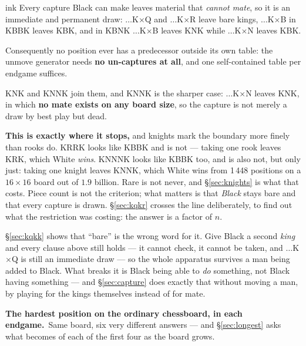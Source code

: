\documentclass[11pt]{article}
\begin{document}
\begin{result}[title={The invariant that makes them tractable}]{ink}
Every capture Black can make leaves material that \emph{cannot mate}, so it is
an immediate and permanent draw:
\;$\ldots$K$\times$Q and $\ldots$K$\times$R leave bare kings,
$\ldots$K$\times$B in KBBK leaves KBK,
and in KBNK $\ldots$K$\times$B leaves KNK while $\ldots$K$\times$N leaves KBK.

Consequently no position ever has a predecessor outside its own table: the
unmove generator needs \textbf{no un-captures at all}, and one self-contained
table per endgame suffices.

KNK and KNNK join them, and KNNK is the sharper case: $\ldots$K$\times$N leaves
KNK, in which \textbf{no mate exists on any board size}, so the capture is not
merely a draw by best play but dead.

\medskip
\textbf{This is exactly where it stops,} and knights mark the boundary more
finely than rooks do. KRRK looks like KBBK and is not --- taking one rook leaves
KRK, which White \emph{wins}. KNNNK looks like KBBK too, and is also not, but
only just: taking one knight leaves KNNK, which White wins from 1\,448 positions
on a $16\times16$ board out of $1.9$ billion. Rare is not never, and \S\ref{sec:knights} is what
that costs. Piece count is not the criterion; what matters is that \emph{Black}
stays bare and that every capture is drawn. \S\ref{sec:kqkr} crosses the line deliberately, to find out what the restriction
was costing: the answer is a factor of $n$.

\smallskip
\S\ref{sec:kqkk} shows that ``bare'' is the wrong word for it. Give Black a second
\emph{king} and every clause above still holds --- it cannot check, it cannot
be taken, and $\ldots$K$\times$Q is still an immediate draw --- so the whole
apparatus survives a man being added to Black. What breaks it is Black being
able to \emph{do} something, not Black having something --- and \S\ref{sec:capture} does
exactly that without moving a man, by playing for the kings themselves instead
of for mate.
\end{result}

\vspace{2mm}
\noindent\textbf{The hardest position on the ordinary chessboard, in each
endgame.}\ Same board, six very different answers --- and \S\ref{sec:longest} asks what
becomes of each of the first four as the board grows.
\end{document}

